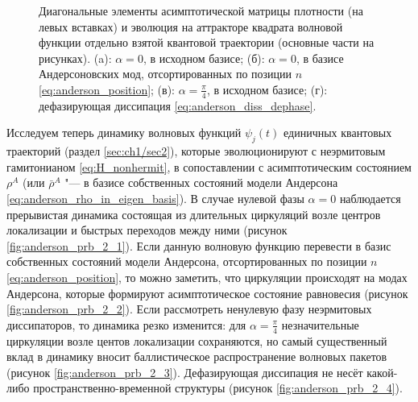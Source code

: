 \begin{figure}[ht]
	\legend{}
	\caption[Динамика квантовых траекторий на квантовых аттракторах в зависимости от параметров неэрмитовой диссипации]
	{
		Диагональные элементы асимптотической матрицы плотности (на левых вставках) и эволюция на аттракторе квадрата волновой функции отдельно взятой квантовой траектории (основные части на рисунках). (a): \(\alpha = 0\), в исходном базисе; (б): \(\alpha = 0\), в базисе Андерсоновских мод, отсортированных по позиции \(n\) \cref{eq:anderson_position}; (в): \(\alpha=\frac{\pi}{4}\), в исходном базисе; (г): дефазирующая диссипация \cref{eq:anderson_diss_dephase}. 
	}
	\label{fig:anderson_prb_2}
\end{figure}

Исследуем теперь динамику волновых функций \(\psi_j(t)\) единичных квантовых траекторий (раздел \cref{sec:ch1/sec2}), которые эволюционируют с неэрмитовым гамитонианом \cref{eq:H_nonhermit}, в сопоставлении с асимптотическим состоянием \(\rho^A\) (или \(\bar{\rho}^A\) "--- в базисе собственных состояний модели Андерсона \cref{eq:anderson_rho_in_eigen_basis}). 
В случае нулевой фазы \(\alpha=0\) наблюдается прерывистая динамика состоящая из длительных циркуляций возле центров локализации и быстрых переходов между ними (рисунок \cref{fig:anderson_prb_2_1}). 
Если данную волновую функцию перевести в базис собственных состояний модели Андерсона,  отсортированных по позиции \(n\) \cref{eq:anderson_position}, то можно заметить, что циркуляции происходят на модах Андерсона, которые формируют асимптотическое состояние равновесия \cite{Yusipov2017} (рисунок \cref{fig:anderson_prb_2_2}). 
Если рассмотреть ненулевую фазу неэрмитовых диссипаторов, то динамика резко изменится: для \(\alpha=\frac{\pi}{4}\) незначительные циркуляции возле центов локализации сохраняются, но самый существенный вклад в динамику вносит баллистическое распространение волновых пакетов (рисунок \cref{fig:anderson_prb_2_3}). 
Дефазирующая диссипация не несёт какой-либо пространственно-временной структуры (рисунок \cref{fig:anderson_prb_2_4}).

